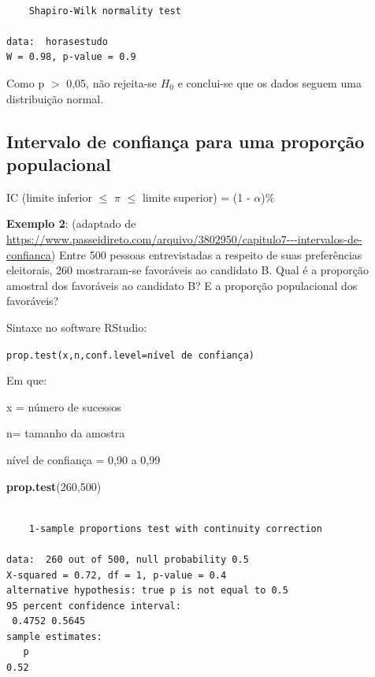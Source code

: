 \documentclass[12pt,brazil,oneside]{book}
\newenvironment{Shaded}{\begin{snugshade}}{\end{snugshade}}
\newcommand{\DecValTok}[1]{\textcolor[rgb]{0.00,0.00,0.81}{#1}}
\newcommand{\KeywordTok}[1]{\textcolor[rgb]{0.13,0.29,0.53}{\textbf{#1}}}
\newcommand{\NormalTok}[1]{#1}
\begin{document}
\begin{verbatim}

    Shapiro-Wilk normality test

data:  horasestudo
W = 0.98, p-value = 0.9
\end{verbatim}

Como p \(>\) 0,05, não rejeita-se \(H_0\) e conclui-se que os dados seguem uma distribuição normal.

\hypertarget{intervalo-de-confianca-para-uma-proporcao-populacional}{%
\subsection{Intervalo de confiança para uma proporção populacional}\label{intervalo-de-confianca-para-uma-proporcao-populacional}}

IC (limite inferior \(\leq\) \(\pi\) \(\leq\) limite superior) = (1 - \(\alpha\))\%

\textbf{Exemplo 2}: (adaptado de \url{https://www.passeidireto.com/arquivo/3802950/capitulo7---intervalos-de-confianca}) Entre 500 pessoas entrevistadas a respeito de suas preferências eleitorais, 260 mostraram-se favoráveis ao candidato B. Qual é a proporção amostral dos favoráveis ao candidato B? E a proporção populacional dos favoráveis?

Sintaxe no software RStudio:

\texttt{prop.test(x,n,conf.level=nível\ de\ confiança)}

Em que:

x = número de sucessos

n= tamanho da amostra

nível de confiança = 0,90 a 0,99

\begin{Shaded}
\begin{Highlighting}[]
\KeywordTok{prop.test}\NormalTok{(}\DecValTok{260}\NormalTok{,}\DecValTok{500}\NormalTok{)}
\end{Highlighting}
\end{Shaded}

\begin{verbatim}

    1-sample proportions test with continuity correction

data:  260 out of 500, null probability 0.5
X-squared = 0.72, df = 1, p-value = 0.4
alternative hypothesis: true p is not equal to 0.5
95 percent confidence interval:
 0.4752 0.5645
sample estimates:
   p 
0.52 
\end{verbatim}
\end{document}
